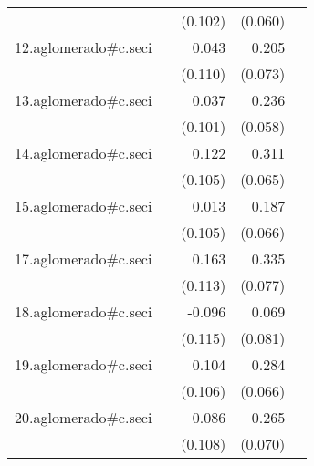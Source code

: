 {\begin{longtable}{l*{4}{D{.}{.}{-1}}}
            &                     &     (0.102)         &     (0.060)         &                     \\
\addlinespace
12.aglomerado#c.seci&                     &       0.043         &       0.205\sym{**} &                     \\
            &                     &     (0.110)         &     (0.073)         &                     \\
\addlinespace
13.aglomerado#c.seci&                     &       0.037         &       0.236\sym{***}&                     \\
            &                     &     (0.101)         &     (0.058)         &                     \\
\addlinespace
14.aglomerado#c.seci&                     &       0.122         &       0.311\sym{***}&                     \\
            &                     &     (0.105)         &     (0.065)         &                     \\
\addlinespace
15.aglomerado#c.seci&                     &       0.013         &       0.187\sym{**} &                     \\
            &                     &     (0.105)         &     (0.066)         &                     \\
\addlinespace
17.aglomerado#c.seci&                     &       0.163         &       0.335\sym{***}&                     \\
            &                     &     (0.113)         &     (0.077)         &                     \\
\addlinespace
18.aglomerado#c.seci&                     &      -0.096         &       0.069         &                     \\
            &                     &     (0.115)         &     (0.081)         &                     \\
\addlinespace
19.aglomerado#c.seci&                     &       0.104         &       0.284\sym{***}&                     \\
            &                     &     (0.106)         &     (0.066)         &                     \\
\addlinespace
20.aglomerado#c.seci&                     &       0.086         &       0.265\sym{***}&                     \\
            &                     &     (0.108)         &     (0.070)         &                     \\

\end{longtable}}

